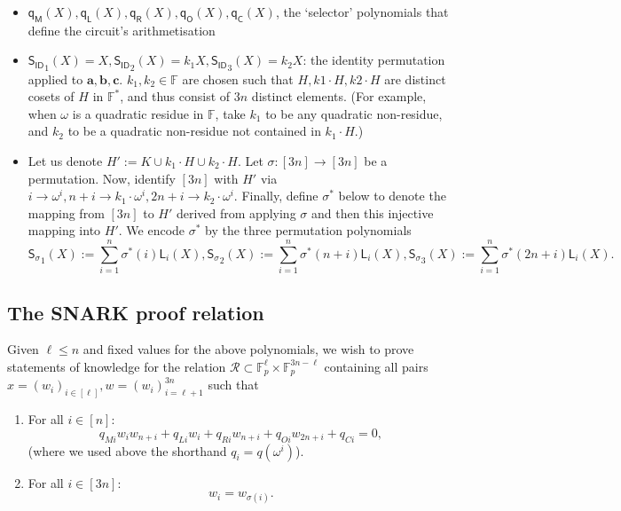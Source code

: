 \documentclass[11pt]{article} %
\newcommand{\F}{\ensuremath{\mathbb F}\xspace}
\newcommand{\defeq}{:=}
\newcommand{\sigpoly}{\ensuremath{\mathsf{S_{\sigma}}}\xspace}
\newcommand{\idpoly}{\ensuremath{\mathsf{S_{ID}}}\xspace}
\newcommand{\lvar}{\ensuremath{\mathbf{a}}\xspace}
\newcommand{\rvar}{\ensuremath{\mathbf{b}}\xspace}
\newcommand{\ovar}{\ensuremath{\mathbf{c}}\xspace}
\newcommand{\lagrangepoly}{\ensuremath{\mathsf{L}}\xspace}
\newcommand{\selmultpoly}{\ensuremath{\mathsf{q_M}}\xspace}
\newcommand{\selleftpoly}{\ensuremath{\mathsf{q_L}}\xspace}
\newcommand{\selrightpoly}{\ensuremath{\mathsf{q_R}}\xspace}
\newcommand{\seloutpoly}{\ensuremath{\mathsf{q_O}}\xspace}
\newcommand{\selconstpoly}{\ensuremath{\mathsf{q_C}}\xspace}
\newcommand{\R}{\mathcal{R}}
\newcommand{\Rsnark}{\R}
\begin{document}
\begin{itemize}
	\item $\selmultpoly(X), \selleftpoly(X), \selrightpoly(X), \seloutpoly(X), \selconstpoly(X)$, the `selector' polynomials that define the circuit's arithmetisation
	\item $\idpoly_1(X) = X, \idpoly_2(X) = k_1X, \idpoly_3(X) = k_2X$: the identity permutation applied to $\lvar, \rvar, \ovar$. $k_1, k_2\in \F$ are chosen such that $H,k1\cdot H,k2\cdot H$ are distinct cosets of $H$ in $\F^*$, and thus consist of $3n$ distinct elements. (For example, when $\omega$ is a quadratic residue in $\F$, take $k_1$ to be any quadratic non-residue, and $k_2$ to be a  quadratic non-residue not contained in $k_1\cdot H$.)
	\item Let us denote $H'\defeq K\cup k_1\cdot H\cup k_2\cdot H$. Let $\sigma:[3n]\to[3n]$ be a permutation. Now, identify $[3n]$ with $H'$ via $i \to \omega^i,n+i \to k_1\cdot \omega^i,2n+i \to k_2\cdot \omega^i$.  Finally, define  $\sigma^{*}$ below to denote the mapping from $[3n]$ to $H'$ derived from applying $\sigma$ and then this injective mapping into $H'$.
We encode $\sigma^*$  by the three permutation polynomials	
	\[\sigpoly_1(X) \defeq \sum_{i=1}^n \sigma^*(i) \lagrangepoly_i(X), \sigpoly_2(X) \defeq \sum_{i=1}^n \sigma^*(n + i) \lagrangepoly_i(X), \sigpoly_3(X) \defeq \sum_{i=1}^n \sigma^*(2n + i) \lagrangepoly_i(X).\]
\end{itemize}

% 
% 
\subsection{The SNARK proof relation}
Given $\ell\leq n$ and fixed values for the above polynomials, we wish to prove statements of knowledge for the relation $\Rsnark\subset \F_p^{\ell}\times \F_p^{3n-\ell}$ containing all pairs
$x=(w_i)_{i \in [\ell]}, w=(w_i)_{i=\ell+1}^{3n}$
such that
\begin{enumerate}
\item For all  $i \in [n]$:  \[q_{Mi} w_i w_{n+i} + q_{Li}w_i  + q_{Ri}w_{n+i} + q_{Oi}w_{2n+i}  + q_{Ci} = 0,\]
(where we used above the shorthand $q_i=q(\omega^i)$).
\item  For all $i \in [3n]$: \[w_i = w_{\sigma(i)}.\]
 
\end{enumerate}
\end{document}
